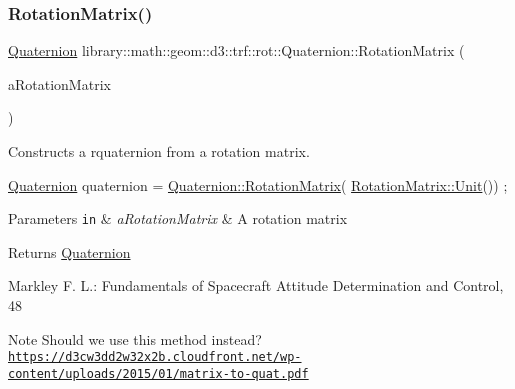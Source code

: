 \subsubsection{\texorpdfstring{Rotation\+Matrix()}{RotationMatrix()}}
{\footnotesize\ttfamily \hyperlink{classlibrary_1_1math_1_1geom_1_1d3_1_1trf_1_1rot_1_1_quaternion}{Quaternion} library\+::math\+::geom\+::d3\+::trf\+::rot\+::\+Quaternion\+::\+Rotation\+Matrix (\begin{DoxyParamCaption}\item[{const \hyperlink{classlibrary_1_1math_1_1geom_1_1d3_1_1trf_1_1rot_1_1_rotation_matrix}{rot\+::\+Rotation\+Matrix} \&}]{a\+Rotation\+Matrix }\end{DoxyParamCaption})\hspace{0.3cm}{\ttfamily [static]}}



Constructs a rquaternion from a rotation matrix. 


\begin{DoxyCode}
\hyperlink{classlibrary_1_1math_1_1geom_1_1d3_1_1trf_1_1rot_1_1_quaternion_a1b8794cce68c5ee86dd50f9ba53635fa}{Quaternion} quaternion = \hyperlink{classlibrary_1_1math_1_1geom_1_1d3_1_1trf_1_1rot_1_1_quaternion_ac153a30d250d35c719e4678a5890a11f}{Quaternion::RotationMatrix}(
      \hyperlink{classlibrary_1_1math_1_1geom_1_1d3_1_1trf_1_1rot_1_1_rotation_matrix_aeb5324151ee55348fa16c5fe78b036ed}{RotationMatrix::Unit}()) ;
\end{DoxyCode}



\begin{DoxyParams}[1]{Parameters}
\mbox{\tt in}  & {\em a\+Rotation\+Matrix} & A rotation matrix \\
\hline
\end{DoxyParams}
\begin{DoxyReturn}{Returns}
\hyperlink{classlibrary_1_1math_1_1geom_1_1d3_1_1trf_1_1rot_1_1_quaternion}{Quaternion} 
\end{DoxyReturn}
Markley F. L.\+: Fundamentals of Spacecraft Attitude Determination and Control, 48 \begin{DoxyNote}{Note}
Should we use this method instead? \href{https://d3cw3dd2w32x2b.cloudfront.net/wp-content/uploads/2015/01/matrix-to-quat.pdf}{\tt https\+://d3cw3dd2w32x2b.\+cloudfront.\+net/wp-\/content/uploads/2015/01/matrix-\/to-\/quat.\+pdf} 
\end{DoxyNote}
\mbox{\label{classlibrary_1_1math_1_1geom_1_1d3_1_1trf_1_1rot_1_1_quaternion_a9e9bdb58d7c344ad3fc3b82d5b4fcd0a}} 
